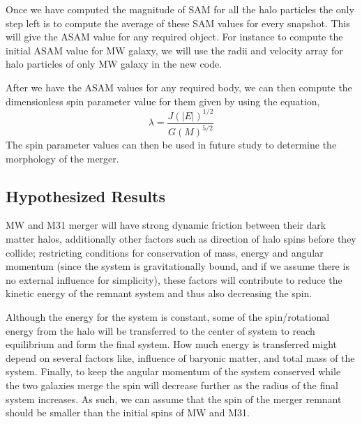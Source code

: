 \documentclass[twocolumn]{aastex631}
\begin{document}
Once we have computed the magnitude of SAM for all the halo particles the only step left is to compute the average of these SAM values for every snapshot. This will give the ASAM value for any required object. For instance to compute the initial ASAM value for MW galaxy, we will use the radii and velocity array for halo particles of only MW galaxy in the new code. 

After we have the ASAM values for any required body, we can then compute the dimensionless spin parameter value for them given by \citet{Peebles1969} using the equation, 
\begin{equation}\label{eq3}
\lambda = \frac{J(|E|)^{1/2}}{G(M)^{5/2}}
\end{equation}
The spin parameter values can then be used in future study to determine the morphology of the merger.
\subsection{Hypothesized Results}
MW and M31 merger will have strong dynamic friction between their dark matter halos, additionally other factors such as direction of halo spins before they collide; restricting conditions for conservation of mass, energy and angular momentum (since the system is gravitationally bound, and if we assume there is no external influence for simplicity), these factors will contribute to reduce the kinetic energy of the remnant system and thus also decreasing the spin.

Although the energy for the system is constant, some of the spin/rotational energy from the halo will be transferred to the center of system to reach equilibrium and form the final system. How much energy is transferred might depend on several factors like, influence of baryonic matter, and total mass of the system. Finally, to keep the angular momentum of the system conserved while the two galaxies merge the spin will decrease further as the radius of the final system increases. As such, we can assume that the spin of the merger remnant should be smaller than the initial spins of MW and M31.



\end{document}
